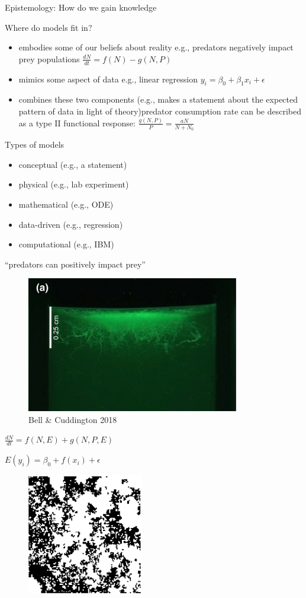 \documentclass[
  ignorenonframetext,
]{beamer}
\providecommand{\tightlist}{%
  \setlength{\itemsep}{0pt}\setlength{\parskip}{0pt}}
\begin{document}
\begin{frame}{Epistemology: How do we gain knowledge}
\begin{block}{Where do models fit in?}
\begin{itemize}
  \begin{itemize}
  \tightlist
  \item
    embodies some of our beliefs about reality e.g., predators
    negatively impact prey populations \(\frac{dN}{dt}=f(N)-g(N,P)\)
  \item
    mimics some aspect of data e.g., linear regression
    \(y_i=\beta_0+\beta_1x_i+\epsilon\)
  \item
    combines these two components (e.g., makes a statement about the
    expected pattern of data in light of theory)predator consumption
    rate can be described as a type II functional response:
    \(\frac{g(N,P)}{P}=\frac{aN}{N+N_0}\)
  \end{itemize}
\end{itemize}
\end{block}

\begin{block}{Types of models}
\protect\hypertarget{types-of-models}{}
\begin{itemize}
\item
  conceptual (e.g., a statement)
\item
  physical (e.g., lab experiment)
\item
  mathematical (e.g., ODE)
\item
  data-driven (e.g., regression)
\item
  computational (e.g., IBM)
\end{itemize}

``predators can positively impact prey''

\begin{figure}

\includegraphics[width=0.35\linewidth]{laurawormscropped} \hfill{}

\caption{Bell & Cuddington 2018}\label{fig:pressure}
\end{figure}

\(\frac{dN}{dt}=f(N,E)+g(N,P,E)\)

\(E(y_i)=β_0+f(x_i)+\epsilon\)

\begin{figure}

\includegraphics[width=0.25\linewidth]{euclidIBM} \hfill{}


\end{figure}
\end{block}
\end{frame}
\end{document}
